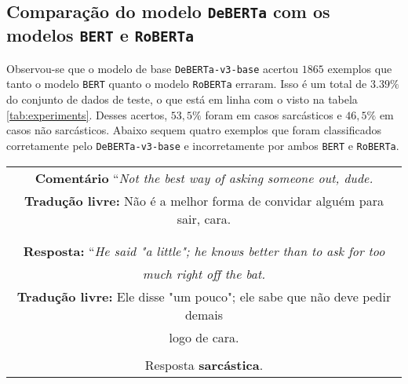 \subsection{Comparação do modelo \texttt{DeBERTa} com os modelos \texttt{BERT} e
\texttt{RoBERTa}}%
\label{sub:comparacao_do_modelo_deberta_com_os_modelos_bert_e_roberta}

Observou-se que o modelo de base \texttt{DeBERTa-v3-base} acertou $1865$
exemplos que tanto o modelo \texttt{BERT} quanto o modelo \texttt{RoBERTa}
erraram. Isso é um total de $3.39\%$ do conjunto de dados de teste, o que está
em linha com o visto na tabela \ref{tab:experiments}. Desses acertos, $53,5\%$
foram em casos sarcásticos e $46,5\%$ em casos não sarcásticos. Abaixo sequem
quatro exemplos que foram classificados corretamente pelo
\texttt{DeBERTa-v3-base} e incorretamente por ambos \texttt{BERT} e
\texttt{RoBERTa}. \jump

\begin{center}
\begin{tabular}{|c|}

\hline

\textbf{Comentário} ``\textit{Not the best way of asking someone out, dude.} \\

\textbf{Tradução livre:} Não é a melhor forma de convidar alguém para sair,
cara. \\ \\

\hline

\\

\textbf{Resposta:} ``\textit{He said "a little"; he knows better than to ask for
too} \\
\textit{much right off the bat.} \\

\textbf{Tradução livre:} Ele disse "um pouco"; ele sabe que não deve pedir demais \\
logo de cara. \\ \\

Resposta \textbf{sarcástica}.

\\ \hline

\end{tabular}
\end{center}

